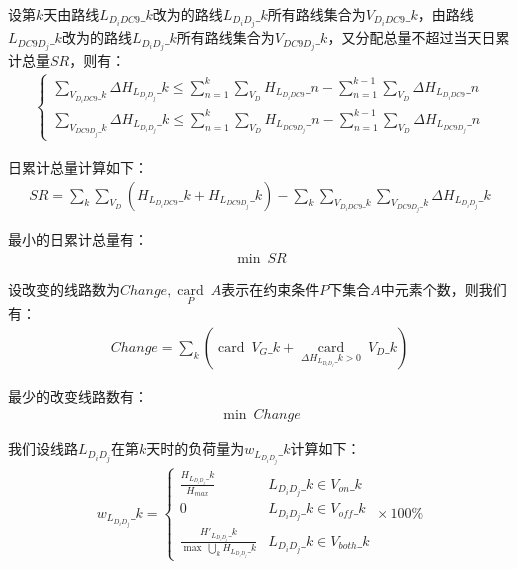 \documentclass{MathorCupmodeling}
\begin{document}
设第$k$天由路线$L_{D_iDC9}\_k$改为的路线$L_{D_iD_j}\_k$所有路线集合为$V_{D_iDC9}\_k$，由路线$L_{DC9D_j}\_k$改为的路线$L_{D_iD_j}\_k$所有路线集合为$V_{DC9D_j}\_k$，又分配总量不超过当天日累计总量$SR$，则有：
\begin{eqnarray}
\left\{\begin{matrix}
\sum\limits_{V_{D_iDC9}\_k}\Delta H_{L_{D_iD_j}}\_k\le \sum\limits_{n=1}^k\sum\limits_{V_D}H_{L_{D_iDC9}}\_n-\sum\limits_{n=1}^{k-1}\sum\limits_{V_D}\Delta H_{L_{D_iDC9}}\_n
\\
\sum\limits_{V_{DC9D_j}\_k}\Delta H_{L_{D_iD_j}}\_k\le \sum\limits_{n=1}^k\sum\limits_{V_D}H_{L_{DC9D_j}}\_n-\sum\limits_{n=1}^{k-1}\sum\limits_{V_D}\Delta H_{L_{DC9D_j}}\_n
\end{matrix}\right.
\end{eqnarray}

日累计总量计算如下：
\begin{eqnarray}
SR=\sum\limits_k\sum\limits_{V_D}(H_{L_{D_iDC9}}\_k+H_{L_{DC9D_j}}\_k)-\sum\limits_k\sum\limits_{V_{D_iDC9}\_k}\sum\limits_{V_{DC9D_j}\_k}\Delta H_{L_{D_iD_j}}\_k
\end{eqnarray}

最小的日累计总量有：
\begin{eqnarray}
\min \ SR
\end{eqnarray}

设改变的线路数为$Change,\mathop{\text{card}}\limits_P\ A$表示在约束条件$P$下集合$A$中元素个数，则我们有：
\begin{eqnarray}
Change=\sum\limits_k(\mathop{\text{card}}\ V_{G}\_k+\mathop{\text{card}}\limits_{\Delta H_{L_{D_iD_j}}\_k>0}\ V_{D}\_k)
\end{eqnarray}

最少的改变线路数有：
\begin{eqnarray}
\min \ Change
\end{eqnarray}

我们设线路$L_{D_iD_j}$在第$k$天时的负荷量为$w_{L_{D_iD_j}}\_k$计算如下：
\begin{eqnarray}
w_{L_{D_iD_j}}\_k=\left\{\begin{matrix}
 \frac{H_{L_{D_iD_j}}\_k}{H_{max}} &L_{D_iD_j}\_k\in V_{on}\_k\\
  0&L_{D_iD_j}\_k\in V_{off}\_k \\
  \frac{H'_{L_{D_iD_j}}\_k}{\max \ \bigcup\limits_{k}H_{L_{D_iD_j}}\_k}& L_{D_iD_j}\_k\in V_{both}\_k
\end{matrix}\right.\times 100\%
\end{eqnarray}
\end{document}
